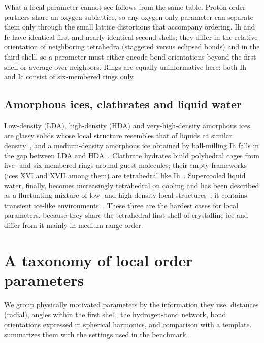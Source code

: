 \documentclass[11pt,a4paper]{article}
\begin{document}
What a local parameter cannot see follows from the same table. Proton-order
partners share an oxygen sublattice, so any oxygen-only parameter can
separate them only through the small lattice distortions that accompany
ordering. Ih and Ic have identical first and nearly identical second shells;
they differ in the relative orientation of neighboring tetrahedra (staggered
versus eclipsed bonds) and in the third shell, so a parameter must either
encode bond orientations beyond the first shell or average over neighbors.
Rings are equally uninformative here: both Ih and Ic consist of six-membered
rings only.

\subsection{Amorphous ices, clathrates and liquid water}
Low-density (LDA), high-density (HDA) and very-high-density amorphous ices are
glassy solids whose local structure resembles that of liquids at similar
density~\cite{Loerting2011,AmannWinkel2016,Handle2017,Tonauer2023}, and a
medium-density amorphous ice obtained by ball-milling Ih falls in the gap
between LDA and HDA~\cite{RosuFinsen2023}. Clathrate hydrates build
polyhedral cages from five- and six-membered rings around guest molecules;
their empty frameworks (ices XVI and XVII among them) are tetrahedral like
Ih~\cite{Falenty_2014,del_Rosso_2016}. Supercooled liquid water, finally,
becomes increasingly tetrahedral on cooling and has been described as a
fluctuating mixture of low- and high-density local
structures~\cite{Russo2014,Wikfeldt2011,Tanaka2019,Li2026}; it contains
transient ice-like environments~\cite{Monserrat2020,Capelli2022}. These three
are the hardest cases for local parameters, because they share the
tetrahedral first shell of crystalline ice and differ from it mainly in
medium-range order.

\section{A taxonomy of local order parameters}\label{sec:taxonomy}
We group physically motivated parameters by the information they use:
distances (radial), angles within the first shell, the hydrogen-bond network,
bond orientations expressed in spherical harmonics, and comparison with a
template.  summarizes them with the settings used in the
benchmark.
\end{document}
